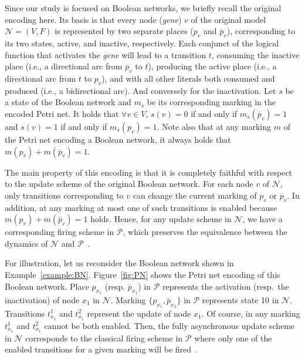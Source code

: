 \documentclass[preprint,12pt]{elsarticle}
\begin{document}
Since our study is focused on Boolean networks, we briefly recall the original encoding here.
Its basis is that every node (\emph{gene}) \(v\) of the original model \(\mathcal{N} = (V, F)\) is represented by two separate places (\(p_v\) and \(\overline{p}_v\)), corresponding to its two states, active, and inactive, respectively.
Each conjunct of the logical function that activates the \emph{gene} will lead to a transition \(t\), consuming the inactive place (i.e., a directional arc from \(\overline{p}_v\) to \(t\)), producing the active place (i.e., a directional arc from \(t\) to \(p_v\)), and with all other literals both consumed and produced (i.e., a bidirectional arc).
And conversely for the inactivation.
Let \(s\) be a state of the Boolean network and \(m_s\) be its corresponding marking in the encoded Petri net. 
It holds that \(\forall v \in V\), \(s(v) = 0\) if and only if \(m_s(\overline{p}_v) = 1\) and \(s(v) = 1\) if and only if \(m_s(p_v) = 1\). Note also that at any marking \(m\) of the Petri net encoding a Boolean network, it always holds that \(m(p_v) + m(\overline{p}_v) = 1\).

The main property of this encoding is that it is completely faithful with respect to the update scheme of the original Boolean network.
For each node \(v\) of \(\mathcal{N}\), only transitions corresponding to \(v\) can change the current marking of \(p_v\) or \(\overline{p}_v\).
In addition, at any marking at most one of such transitions is enabled because \(m(p_v) + m(\overline{p}_v) = 1\) holds.
Hence, for any update scheme in \(\mathcal{N}\), we have a corresponding firing scheme in \(\mathcal{P}\), which preserves the equivalence between the dynamics of \(\mathcal{N}\) and \(\mathcal{P}\)~\cite{DBLP:journals/nc/ChatainHKPT20}.

For illustration, let us reconsider the Boolean network shown in Example~\ref{example:BN}.
Figure~\ref{fig:PN} shows the Petri net encoding of this Boolean network.
Place \(p_{x_1}\) (resp. \(\overline{p}_{x_1}\)) in \(\mathcal{P}\) represents the activation (resp.\ the inactivation) of node \(x_1\) in \(\mathcal{N}\).
Marking \(\{p_{x_1}, \overline{p}_{x_2}\}\) in \(\mathcal{P}\) represents state 10 in \(\mathcal{N}\).
Transitions \(t^{1}_{x_1}\) and \(t^{2}_{x_1}\) represent the update of node \(x_1\).
Of course, in any marking \(t^{1}_{x_1}\) and \(t^{2}_{x_1}\) cannot be both enabled.
Then, the fully asynchronous update scheme in \(\mathcal{N}\) corresponds to the classical firing scheme in \(\mathcal{P}\) where only one of the enabled transitions for a given marking will be fired~\cite{Murata1989}.
\end{document}
